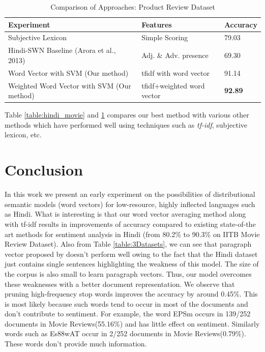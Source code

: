 \documentclass[11pt,a4paper]{article}
\begin{document}
\begin {table}[H]
\centering
\small
\begin{tabular}{ | p{3.5cm} | p{1.8cm} | p{1.2cm} | }
\hline
\textbf{Experiment} & \textbf{Features} & \textbf{Accuracy} \\ \hline
Subjective Lexicon~\cite{Bakliwal:12} & Simple Scoring & 79.03\\ \hline
Hindi-SWN Baseline (Arora et al., 2013) & Adj. \& Adv. presence & 69.30\\ \hline
Word Vector with SVM (Our method) & tfidf with word vector & 91.14\\ \hline
Weighted Word Vector with SVM (Our method) & tfidf+weighted word vector & \textbf{92.89}\\ \hline
\end{tabular}
\caption {Comparison of Approaches: Product Review Dataset}
\label{table:hindi_product}
\end{table}
Table \ref{table:hindi_movie} and \ref{table:hindi_product} compares our best method with various other methods which have performed well using techniques such as \emph{tf-idf}, subjective lexicon, etc.

\section{Conclusion}
\label{sec:conclusion}
In this work we present an early experiment on the possibilities of distributional semantic models (word vectors) for low-resource, highly inflected languages such as Hindi.  What is interesting is that our word vector averaging method along with tf-idf results in improvements of accuracy compared to existing state-of-the art methods for sentiment analysis in Hindi (from 80.2\% to 90.3\% on IITB Movie Review Dataset). Also from Table \ref{table:3Datasets}, we can see that paragraph vector proposed by \cite{Le:14} doesn't perform well owing to the fact that the Hindi dataset just contains single sentences highlighting the weakness of this model. The size of the corpus is also small to learn paragraph vectors. Thus, our model overcomes these weaknesses with a better document representation.
We observe that pruning high-frequency stop words improves the accuracy by around 0.45\%. This is most likely  because such words tend to occur in most of the documents and don't contribute to sentiment. For example, the word {\dn EPSm} occurs in 139/252 documents in Movie Reviews(55.16\%) and has little effect on sentiment. Similarly words such as {\dn Es\388wAT\0} occur in 2/252 documents in Movie Reviews(0.79\%). These words don't provide much information.
\end{document}
